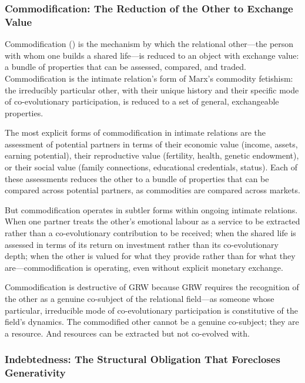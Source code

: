 \subsubsection{Commodification: The Reduction of the Other to Exchange Value}
\label{p15:subsubsec:commodification}

\noindent
Commodification () is the mechanism by which the relational other---the person with whom one builds a shared life---is reduced to an object with exchange value: a bundle of properties that can be assessed, compared, and traded. Commodification is the intimate relation's form of Marx's commodity fetishism: the irreducibly particular other, with their unique history and their specific mode of co-evolutionary participation, is reduced to a set of general, exchangeable properties.

The most explicit forms of commodification in intimate relations are the assessment of potential partners in terms of their economic value (income, assets, earning potential), their reproductive value (fertility, health, genetic endowment), or their social value (family connections, educational credentials, status). Each of these assessments reduces the other to a bundle of properties that can be compared across potential partners, as commodities are compared across markets.

But commodification operates in subtler forms within ongoing intimate relations. When one partner treats the other's emotional labour as a service to be extracted rather than a co-evolutionary contribution to be received; when the shared life is assessed in terms of its return on investment rather than its co-evolutionary depth; when the other is valued for what they provide rather than for what they are---commodification is operating, even without explicit monetary exchange.

Commodification is destructive of GRW because GRW requires the recognition of the other as a genuine co-subject of the relational field---as someone whose particular, irreducible mode of co-evolutionary participation is constitutive of the field's dynamics. The commodified other cannot be a genuine co-subject; they are a resource. And resources can be extracted but not co-evolved with.

\subsubsection{Indebtedness: The Structural Obligation That Forecloses Generativity}
\label{p15:subsubsec:indebtedness}

